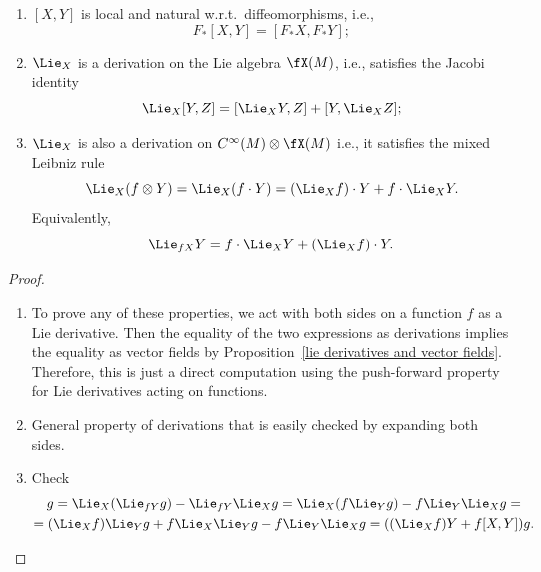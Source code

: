 \begin{prop}\label{prop properties of Lie derivatives}
\begin{enumerate}
    \item $[X,Y]$ is local and natural w.r.t.\ diffeomorphisms, i.e., \[F_\ast [X,Y]=[F_\ast X,F_\ast Y];\]
    \item $\Lie_X$ is a derivation on the Lie algebra $\fX(M)$, i.e., satisfies the Jacobi identity
    \[\Lie_X [Y,Z]=[\Lie_X Y,Z]+[Y,\Lie_X Z];\]
    \item $\Lie_X$ is also a derivation on $C^\infty(M)\otimes \fX(M)$ i.e., it satisfies the mixed Leibniz rule
    \[\Lie_X(f\otimes Y)=\Lie_X(f\cdot Y)=(\Lie_X f)\cdot Y+f\cdot \Lie_X Y.\]
    Equivalently, 
    \[\Lie_{fX}Y=f\cdot \Lie_X Y+\left(\Lie_X f\right)\cdot Y.\label{Lie derivative not covariant}\]
\end{enumerate}
\end{prop}
\begin{proof}
    \begin{enumerate}
        \item To prove any of these properties, we act with both sides on a function $f$ as a Lie derivative. Then the equality of the two expressions as derivations implies the equality as vector fields by Proposition~\ref{lie derivatives and vector fields}. Therefore, this is just a direct computation using the push-forward property for Lie derivatives acting on functions.
        \item General property of derivations that is easily checked by expanding both sides.
        \item Check 
        \begin{multline}
            [X,fY]g=\Lie_X (\Lie_{fY}g)-\Lie_{fY}\Lie_X g=\Lie_X (f\Lie_Y g)-f\Lie_Y \Lie_X g=\\=(\Lie_X f)\Lie_Y g+f\Lie_X\Lie_Y g-f\Lie_Y\Lie_X g=((\Lie_X f)Y+f[X,Y])g.
        \end{multline}
    \end{enumerate}
\end{proof}


